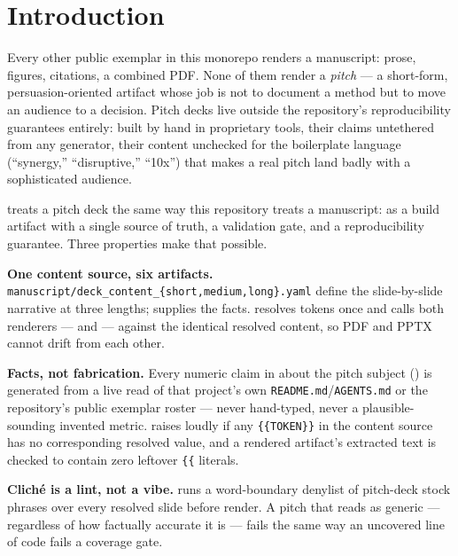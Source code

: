 \documentclass[
]{article}
\begin{document}
\newpage

\section{Introduction}\label{sec:introduction}

Every other public exemplar in this monorepo renders a manuscript:
prose, figures, citations, a combined PDF. None of them render a
\emph{pitch} --- a short-form, persuasion-oriented artifact whose job is
not to document a method but to move an audience to a decision. Pitch
decks live outside the repository's reproducibility guarantees entirely:
built by hand in proprietary tools, their claims untethered from any
generator, their content unchecked for the boilerplate language
(``synergy,'' ``disruptive,'' ``10x'') that makes a real pitch land
badly with a sophisticated audience.

 treats a pitch deck the same way this
repository treats a manuscript: as a build artifact with a single source
of truth, a validation gate, and a reproducibility guarantee. Three
properties make that possible.

\textbf{One content source, six artifacts.}
\texttt{manuscript/deck\_content\_\{short,medium,long\}.yaml} define the
slide-by-slide narrative at three lengths;
 supplies the facts.
 resolves tokens once and calls both
renderers --- 
and  ---
against the identical resolved content, so PDF and PPTX cannot drift
from each other.

\textbf{Facts, not fabrication.} Every numeric claim in
 about the pitch subject
() is generated from a live read of that
project's own \texttt{README.md}/\texttt{AGENTS.md} or the repository's
public exemplar roster --- never hand-typed, never a plausible-sounding
invented metric.  raises loudly if any
\texttt{\{\{TOKEN\}\}} in the content source has no corresponding
resolved value, and a rendered artifact's extracted text is checked to
contain zero leftover \texttt{\{\{} literals.

\textbf{Cliché is a lint, not a vibe.}  runs
a word-boundary denylist of pitch-deck stock phrases over every resolved
slide before render. A pitch that reads as generic --- regardless of how
factually accurate it is --- fails the same way an uncovered line of
code fails a coverage gate.
\end{document}
